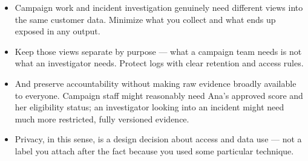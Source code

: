 \documentclass[11pt,a4paper]{article}
\begin{document}
\begin{examplebox}[title after break={SPOKEN SCRIPT --- slide 43 continued}]
\begin{itemize}
\item Campaign work and incident investigation genuinely need different views into the same customer data. Minimize what you collect and what ends up exposed in any output.
\item Keep those views separate by purpose — what a campaign team needs is not what an investigator needs. Protect logs with clear retention and access rules.
\item And preserve accountability without making raw evidence broadly available to everyone. Campaign staff might reasonably need Ana's approved score and her eligibility status; an investigator looking into an incident might need much more restricted, fully versioned evidence.
\item Privacy, in this sense, is a design decision about access and data use — not a label you attach after the fact because you used some particular technique.
\end{itemize}
\end{examplebox}
\par\noindent{\scriptsize\textcolor{teal!60!black}{Reading anchor: Bass, Ch. 9–10 / §14.2}}
\clearpage
\end{document}
